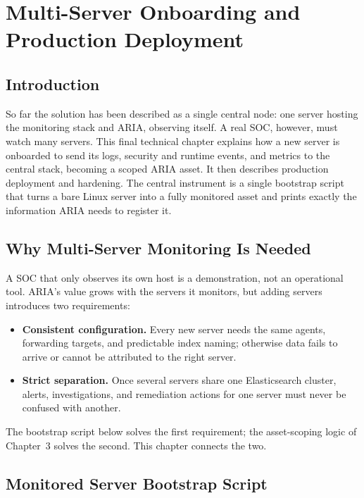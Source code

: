 \chapter{Multi-Server Onboarding and Production Deployment}

\section{Introduction}

So far the solution has been described as a single central node: one server hosting the monitoring stack and ARIA, observing itself. A real SOC, however, must watch many servers. This final technical chapter explains how a new server is onboarded to send its logs, security and runtime events, and metrics to the central stack, becoming a scoped ARIA asset. It then describes production deployment and hardening. The central instrument is a single bootstrap script that turns a bare Linux server into a fully monitored asset and prints exactly the information ARIA needs to register it.

\section{Why Multi-Server Monitoring Is Needed}

A SOC that only observes its own host is a demonstration, not an operational tool. ARIA's value grows with the servers it monitors, but adding servers introduces two requirements:

\begin{itemize}[leftmargin=1cm]
\item \textbf{Consistent configuration.} Every new server needs the same agents, forwarding targets, and predictable index naming; otherwise data fails to arrive or cannot be attributed to the right server.
\item \textbf{Strict separation.} Once several servers share one Elasticsearch cluster, alerts, investigations, and remediation actions for one server must never be confused with another.
\end{itemize}

The bootstrap script below solves the first requirement; the asset-scoping logic of Chapter~3 solves the second. This chapter connects the two.

\section{Monitored Server Bootstrap Script}

